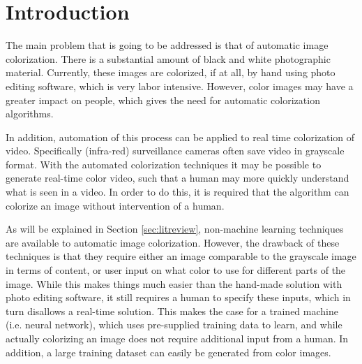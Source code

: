 \section{Introduction}
The main problem that is going to be addressed is that of automatic image colorization. There is a substantial amount of black and white photographic material. Currently, these images are colorized, if at all, by hand using photo editing software, which is very labor intensive. However, color images may have a greater impact on people, which gives the need for automatic colorization algorithms.

In addition, automation of this process can be applied to real time colorization of video. Specifically (infra-red) surveillance cameras often save video in grayscale format. With the automated colorization techniques it may be possible to generate real-time color video, such that a human may more quickly understand what is seen in a video. In order to do this, it is required that the algorithm can colorize an image without intervention of a human.

As will be explained in Section \ref{sec:litreview}, non-machine learning techniques are available to automatic image colorization. However, the drawback of these techniques is that they require either an image comparable to the grayscale image in terms of content, or user input on what color to use for different parts of the image. While this makes things much easier than the hand-made solution with photo editing software, it still requires a human to specify these inputs, which in turn disallows a real-time solution. This makes the case for a trained machine (i.e. neural network), which uses pre-supplied training data to learn, and while actually colorizing an image does not require additional input from a human. In addition, a large training dataset can easily be generated from color images.
